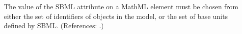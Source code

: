 The value of the SBML attribute  on a MathML 
element must be chosen from either the set of identifiers of
\UnitDefinition objects in the model, or the set of base units defined by
SBML.  (References: .)
